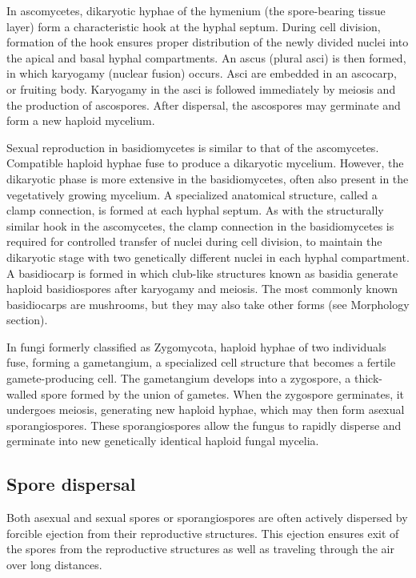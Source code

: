In ascomycetes, dikaryotic hyphae of the hymenium (the spore-bearing tissue layer) form a characteristic hook at the hyphal septum. During cell division, formation of the hook ensures proper distribution of the newly divided nuclei into the apical and basal hyphal compartments. An ascus (plural asci) is then formed, in which karyogamy (nuclear fusion) occurs. Asci are embedded in an ascocarp, or fruiting body. Karyogamy in the asci is followed immediately by meiosis and the production of ascospores. After dispersal, the ascospores may germinate and form a new haploid mycelium.

Sexual reproduction in basidiomycetes is similar to that of the ascomycetes. Compatible haploid hyphae fuse to produce a dikaryotic mycelium. However, the dikaryotic phase is more extensive in the basidiomycetes, often also present in the vegetatively growing mycelium. A specialized anatomical structure, called a clamp connection, is formed at each hyphal septum. As with the structurally similar hook in the ascomycetes, the clamp connection in the basidiomycetes is required for controlled transfer of nuclei during cell division, to maintain the dikaryotic stage with two genetically different nuclei in each hyphal compartment. A basidiocarp is formed in which club-like structures known as basidia generate haploid basidiospores after karyogamy and meiosis. The most commonly known basidiocarps are mushrooms, but they may also take other forms (see Morphology section).

In fungi formerly classified as Zygomycota, haploid hyphae of two individuals fuse, forming a gametangium, a specialized cell structure that becomes a fertile gamete-producing cell. The gametangium develops into a zygospore, a thick-walled spore formed by the union of gametes. When the zygospore germinates, it undergoes meiosis, generating new haploid hyphae, which may then form asexual sporangiospores. These sporangiospores allow the fungus to rapidly disperse and germinate into new genetically identical haploid fungal mycelia.

\hypertarget{spore-dispersal}{%
\subsection{Spore dispersal}\label{spore-dispersal}}

Both asexual and sexual spores or sporangiospores are often actively dispersed by forcible ejection from their reproductive structures. This ejection ensures exit of the spores from the reproductive structures as well as traveling through the air over long distances.

